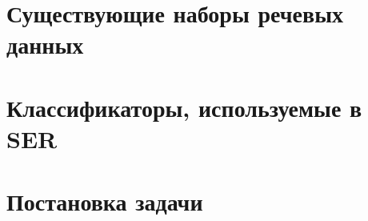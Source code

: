 
%
%
%
%
%


\section{Существующие наборы речевых данных}
\section{Классификаторы, используемые в SER}
\section{Постановка задачи}